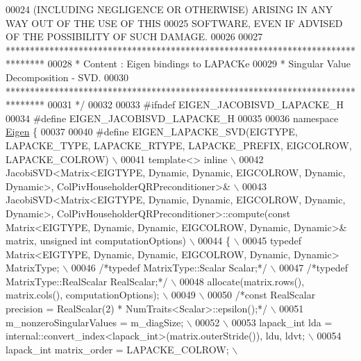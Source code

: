 \begin{DoxyCode}
00024 \textcolor{comment}{ (INCLUDING NEGLIGENCE OR OTHERWISE) ARISING IN ANY WAY OUT OF THE USE OF THIS}
00025 \textcolor{comment}{ SOFTWARE, EVEN IF ADVISED OF THE POSSIBILITY OF SUCH DAMAGE.}
00026 \textcolor{comment}{}
00027 \textcolor{comment}{ ********************************************************************************}
00028 \textcolor{comment}{ *   Content : Eigen bindings to LAPACKe}
00029 \textcolor{comment}{ *    Singular Value Decomposition - SVD.}
00030 \textcolor{comment}{ ********************************************************************************}
00031 \textcolor{comment}{*/}
00032 
00033 \textcolor{preprocessor}{#ifndef EIGEN\_JACOBISVD\_LAPACKE\_H}
00034 \textcolor{preprocessor}{#define EIGEN\_JACOBISVD\_LAPACKE\_H}
00035 
00036 \textcolor{keyword}{namespace }\hyperlink{namespace_eigen}{Eigen} \{ 
00037 
00040 \textcolor{preprocessor}{#define EIGEN\_LAPACKE\_SVD(EIGTYPE, LAPACKE\_TYPE, LAPACKE\_RTYPE, LAPACKE\_PREFIX, EIGCOLROW, LAPACKE\_COLROW) 
      \(\backslash\)}
00041 \textcolor{preprocessor}{template<> inline \(\backslash\)}
00042 \textcolor{preprocessor}{JacobiSVD<Matrix<EIGTYPE, Dynamic, Dynamic, EIGCOLROW, Dynamic, Dynamic>,
       ColPivHouseholderQRPreconditioner>& \(\backslash\)}
00043 \textcolor{preprocessor}{JacobiSVD<Matrix<EIGTYPE, Dynamic, Dynamic, EIGCOLROW, Dynamic, Dynamic>,
       ColPivHouseholderQRPreconditioner>::compute(const Matrix<EIGTYPE, Dynamic, Dynamic, EIGCOLROW, Dynamic, Dynamic>& matrix, unsigned int
       computationOptions) \(\backslash\)}
00044 \textcolor{preprocessor}{\{ \(\backslash\)}
00045 \textcolor{preprocessor}{  typedef Matrix<EIGTYPE, Dynamic, Dynamic, EIGCOLROW, Dynamic, Dynamic> MatrixType; \(\backslash\)}
00046 \textcolor{preprocessor}{  }\textcolor{comment}{/*typedef MatrixType::Scalar Scalar;*/}\textcolor{preprocessor}{ \(\backslash\)}
00047 \textcolor{preprocessor}{  }\textcolor{comment}{/*typedef MatrixType::RealScalar RealScalar;*/}\textcolor{preprocessor}{ \(\backslash\)}
00048 \textcolor{preprocessor}{  allocate(matrix.rows(), matrix.cols(), computationOptions); \(\backslash\)}
00049 \textcolor{preprocessor}{\(\backslash\)}
00050 \textcolor{preprocessor}{  }\textcolor{comment}{/*const RealScalar precision = RealScalar(2) * NumTraits<Scalar>::epsilon();*/}\textcolor{preprocessor}{ \(\backslash\)}
00051 \textcolor{preprocessor}{  m\_nonzeroSingularValues = m\_diagSize; \(\backslash\)}
00052 \textcolor{preprocessor}{\(\backslash\)}
00053 \textcolor{preprocessor}{  lapack\_int lda = internal::convert\_index<lapack\_int>(matrix.outerStride()), ldu, ldvt; \(\backslash\)}
00054 \textcolor{preprocessor}{  lapack\_int matrix\_order = LAPACKE\_COLROW; \(\backslash\)}

\end{DoxyCode}
